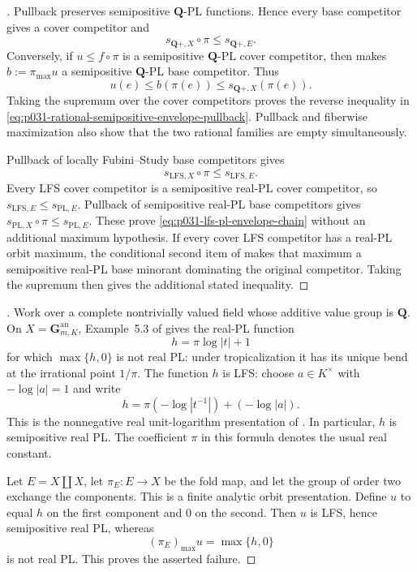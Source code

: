 \begin{proof}[]
Pullback preserves semipositive $\mathbf Q$-PL functions.  Hence every
base competitor gives a cover competitor and
\[
                  s_{\mathbf Q+,X}\circ\pi
                         \leq s_{\mathbf Q+,E}.
\]
Conversely, if $u\leq f\circ\pi$ is a semipositive $\mathbf Q$-PL cover
competitor, then  makes
$b:=\pi_{\max}u$ a semipositive $\mathbf Q$-PL base competitor.  Thus
\[
          u(e)\leq b(\pi(e))
              \leq s_{\mathbf Q+,X}(\pi(e)).
\]
Taking the supremum over the cover competitors proves the reverse
inequality in
\eqref{eq:p031-rational-semipositive-envelope-pullback}.  Pullback and
fiberwise maximization also show that the two rational families are empty
simultaneously.

Pullback of locally Fubini--Study base competitors gives
\[
                 s_{\mathrm{LFS},X}\circ\pi
                        \leq s_{\mathrm{LFS},E}.
\]
Every LFS cover competitor is a semipositive real-PL cover competitor,
so $s_{\mathrm{LFS},E}\leq s_{\mathrm{PL},E}$. Pullback of semipositive
real-PL base competitors gives
$s_{\mathrm{PL},X}\circ\pi\leq s_{\mathrm{PL},E}$. These prove
\eqref{eq:p031-lfs-pl-envelope-chain} without an additional maximum
hypothesis. If every cover LFS competitor has a real-PL orbit maximum,
the conditional second item of  makes
that maximum a semipositive real-PL base minorant dominating the original
competitor. Taking the supremum then gives the additional stated inequality.
\end{proof}

\begin{proof}[]
Work over a complete nontrivially valued field whose additive value group
is $\mathbf Q$.  On $X=\mathbf G_{m,K}^{\mathrm{an}}$, Example~5.3 of
\cite{GJR26} gives the real-PL function
\[
                         h=\pi\log|t|+1
\]
for which $\max\{h,0\}$ is not real PL: under tropicalization it has its
unique bend at the irrational point $1/\pi$.  The function $h$ is LFS: choose $a\in K^\times$ with $-\log|a|=1$
and write
\[
 h=\pi(-\log|t^{-1}|)+(-\log|a|).
\]
This is the nonnegative real unit-logarithm presentation of
\cite[\S7.9]{GJR26}. In particular, $h$ is semipositive real PL.
The coefficient $\pi$ in this formula denotes the usual real constant.

Let $E=X\amalg X$, let $\pi_E:E\to X$ be the fold map, and let the group
of order two exchange the components.  This is a finite analytic orbit
presentation.  Define $u$ to equal $h$ on the first component and $0$ on
the second.  Then $u$ is LFS, hence semipositive real PL, whereas
\[
                         (\pi_E)_{\max}u=\max\{h,0\}
\]
is not real PL.  This proves the asserted failure.
\end{proof}
